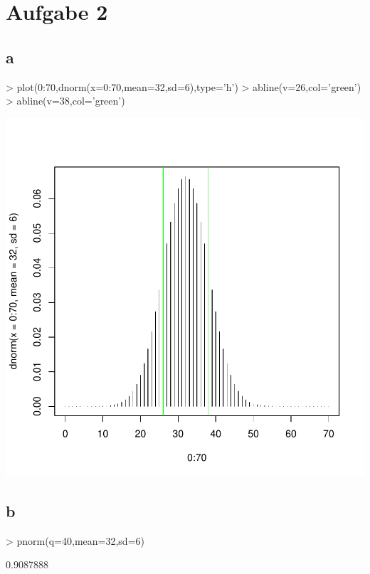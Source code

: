 

\section{Aufgabe 2}

\subsection{a}
\begin{Schunk}
\begin{Sinput}
> plot(0:70,dnorm(x=0:70,mean=32,sd=6),type='h')
> abline(v=26,col='green')
> abline(v=38,col='green')
\end{Sinput}
\end{Schunk}
\includegraphics{sw10_2-001}

\subsection{b}
\begin{Schunk}
\begin{Sinput}
> pnorm(q=40,mean=32,sd=6)
\end{Sinput}
\begin{Soutput}
[1] 0.9087888
\end{Soutput}
\end{Schunk}

